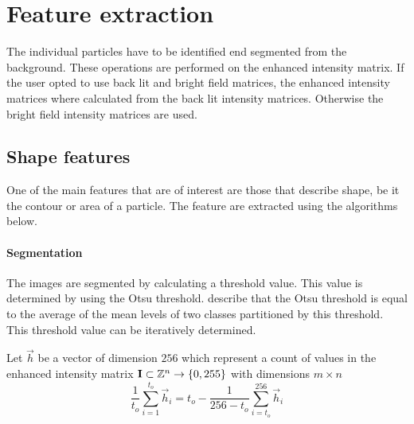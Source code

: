 \documentclass[11pt,fleqn,,a4paper,twoside,openright]{book}
\begin{document}
\section{Feature extraction}\label{Segmentation}
The individual particles have to be identified end segmented from the background. These operations are performed on the enhanced intensity matrix. If the user opted to use back lit and bright field matrices, the enhanced intensity matrices where calculated from the back lit intensity matrices. Otherwise the bright field intensity matrices are used.

\subsection{Shape features}
One of the main features that are of interest are those that describe shape, be it the contour or area of a particle. The feature are extracted using the algorithms below.

\paragraph{Segmentation}
The images are segmented by calculating a threshold value. This value is determined by using the Otsu threshold. \citeauthor{Xu2011956} \cite{Xu2011956} describe that the Otsu threshold is equal to the average of the mean levels of two classes partitioned by this threshold. This threshold value can be iteratively determined.

\begin{sBox}
	Let $\vec{h}$ be a vector of dimension $256$ which represent a count of values in the enhanced intensity matrix $\mat{I} \subset \mathbb{Z}^n \rightarrow \{0, 255\}$ with dimensions $m \times n$
	\begin{equation}\label{OtsuMethodEq}
	\frac{1}{t_o}\sum\limits_{i=1}^{t_o} \vec{h}_i = t_o - \frac{1}{256 - t_o}\sum\limits_{i=t_o}^{256} \vec{h}_i
	\end{equation}
\end{sBox}
\end{document}
